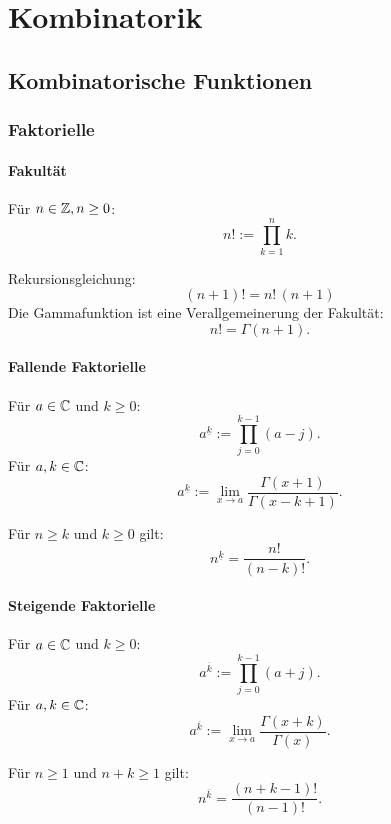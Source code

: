
\chapter{Kombinatorik}
\section{Kombinatorische Funktionen}
\subsection{Faktorielle}
\subsubsection{Fakultät}
\begin{Definition}
Für $n\in\mathbb Z, n\ge 0$:
\begin{equation}
n! := \prod_{k=1}^n k.
\end{equation}
\end{Definition}
\noindent
Rekursionsgleichung:
\begin{equation}
(n+1)! = n!\,(n+1)
\end{equation}
Die Gammafunktion ist eine Verallgemeinerung der Fakultät:
\begin{equation}
n! = \Gamma(n+1).
\end{equation}

\subsubsection{Fallende Faktorielle}
\begin{Definition}
Für $a\in\mathbb C$ und $k\ge 0$:
\begin{equation}\label{eq:FF}
a^{\underline k} := \prod_{j=0}^{k-1} (a-j).
\end{equation}
Für $a,k\in\mathbb C$:
\begin{equation}
a^{\underline k} := \lim_{x\to a}\frac{\Gamma(x+1)}{\Gamma(x-k+1)}.
\end{equation}
\end{Definition}
\noindent
Für $n\ge k$ und $k\ge 0$ gilt:
\begin{equation}
n^{\underline k} = \frac{n!}{(n-k)!}.
\end{equation}

\subsubsection{Steigende Faktorielle}
\begin{Definition}
Für $a\in\mathbb C$ und $k\ge 0$:
\begin{equation}
a^{\overline k} := \prod_{j=0}^{k-1} (a+j).
\end{equation}
Für $a,k\in\mathbb C$:
\begin{equation}
a^{\overline k} := \lim_{x\to a}\frac{\Gamma(x+k)}{\Gamma(x)}.
\end{equation}
\end{Definition}
\noindent
Für $n\ge 1$ und $n+k\ge 1$ gilt:
\begin{equation}
n^{\overline k} = \frac{(n+k-1)!}{(n-1)!}.
\end{equation}


